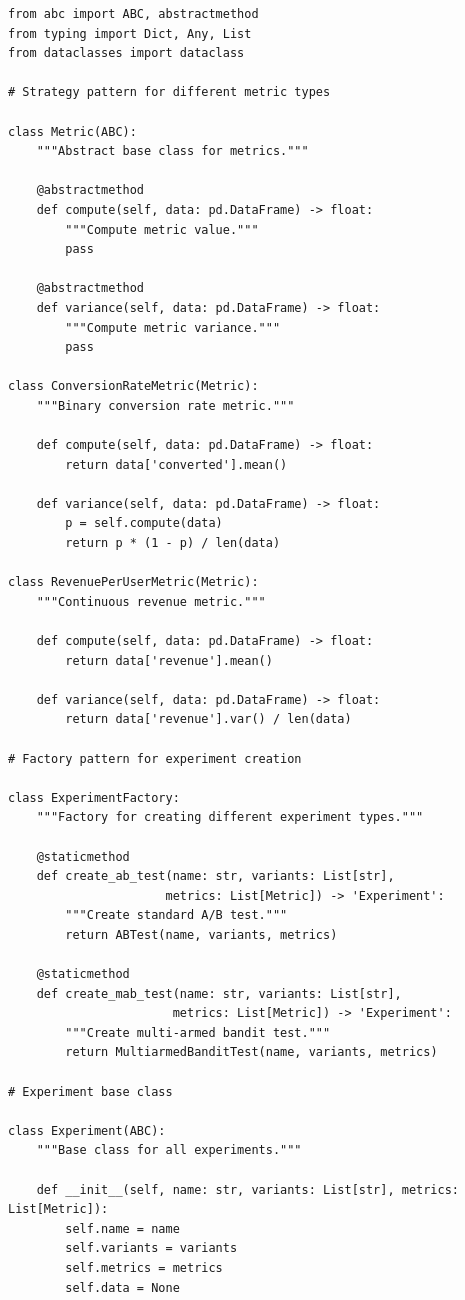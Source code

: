 \lstset{language=Python, caption=OOP Design Patterns for Experiments}
\begin{lstlisting}
from abc import ABC, abstractmethod
from typing import Dict, Any, List
from dataclasses import dataclass

# Strategy pattern for different metric types

class Metric(ABC):
    """Abstract base class for metrics."""

    @abstractmethod
    def compute(self, data: pd.DataFrame) -> float:
        """Compute metric value."""
        pass

    @abstractmethod
    def variance(self, data: pd.DataFrame) -> float:
        """Compute metric variance."""
        pass

class ConversionRateMetric(Metric):
    """Binary conversion rate metric."""

    def compute(self, data: pd.DataFrame) -> float:
        return data['converted'].mean()

    def variance(self, data: pd.DataFrame) -> float:
        p = self.compute(data)
        return p * (1 - p) / len(data)

class RevenuePerUserMetric(Metric):
    """Continuous revenue metric."""

    def compute(self, data: pd.DataFrame) -> float:
        return data['revenue'].mean()

    def variance(self, data: pd.DataFrame) -> float:
        return data['revenue'].var() / len(data)

# Factory pattern for experiment creation

class ExperimentFactory:
    """Factory for creating different experiment types."""

    @staticmethod
    def create_ab_test(name: str, variants: List[str],
                      metrics: List[Metric]) -> 'Experiment':
        """Create standard A/B test."""
        return ABTest(name, variants, metrics)

    @staticmethod
    def create_mab_test(name: str, variants: List[str],
                       metrics: List[Metric]) -> 'Experiment':
        """Create multi-armed bandit test."""
        return MultiarmedBanditTest(name, variants, metrics)

# Experiment base class

class Experiment(ABC):
    """Base class for all experiments."""

    def __init__(self, name: str, variants: List[str], metrics: List[Metric]):
        self.name = name
        self.variants = variants
        self.metrics = metrics
        self.data = None


\end{lstlisting}
